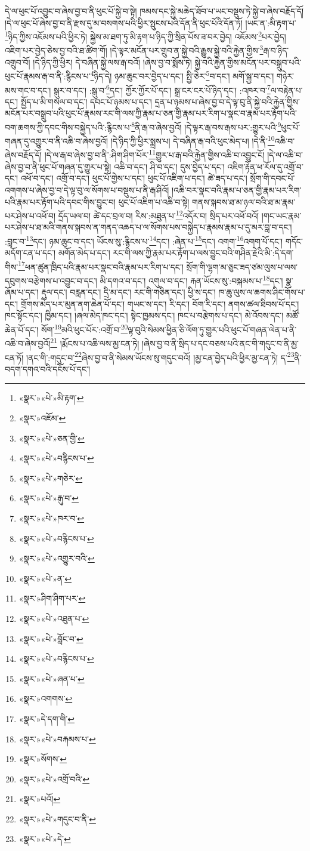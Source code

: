 དེ་ལ་ཕུང་པོ་འབྱུང་བ་ཞེས་བྱ་བ་ནི་ཕུང་པོ་སྐྱེ་བ་སྟེ། ཁམས་དང་སྐྱེ་མཆེད་ཐོབ་པ་ཡང་བསྡུས་ཏེ་སྐྱེ་བ་ཞེས་བརྗོད་དོ། །དེ་ལ་ཕུང་པོ་ཞེས་བྱ་བ་ནི་རྫས་དུ་མ་བསགས་པའི་ཕྱིར་སྤུངས་པའི་དོན་ནི་ཕུང་པོའི་དོན་ཏོ། །ཡང་ན་:མི་རྟག་པ་\footnote{«སྣར་»«པེ་»མི་རྟག་}ཉིད་ཀྱིས་འཇོམས་པའི་ཕྱིར་ཏེ། སྐྱེས་མ་ཐག་ཏུ་མི་རྟག་པ་ཉིད་ཀྱི་སྲིན་པོས་ཟ་བར་བྱེད། འཇོམས་\footnote{«སྣར་»འཇོམ་}པར་བྱེད། འཇིག་པར་བྱེད་ཅེས་བྱ་བའི་ཐ་ཚིག་གོ། །དེ་ལྟར་མངོན་པར་གྲུབ་ན་སྐྱེ་བའི་རྒྱུས་སྐྱེ་བའི་རྐྱེན་གྱིས་\footnote{«སྣར་»«པེ་»ཅན་གྱི་}རྒ་བ་ཉིད་འགྲུབ་བོ། །དེ་ཉིད་ཀྱི་ཕྱིར། དེ་བཞིན་སྐྱེ་ལས་རྒ་བའོ། །ཞེས་བྱ་བ་སྨོས་ཏེ། སྐྱེ་བའི་རྐྱེན་གྱིས་མངོན་པར་བསྒྲུབ་པའི་ཕུང་པོ་རྣམས་རྒ་བ་ནི་:རྙིངས་པ་\footnote{«སྣར་»«པེ་»བརྙིངས་པ་}ཉིད་དེ། ཉམ་ཆུང་བར་བྱེད་པ་དང་། སྤྱི་ཅེར་\footnote{«སྣར་»«པེ་»གཅེར་}བ་དང་། མགོ་སྐྱ་བ་དང་། གཉེར་མས་གང་བ་དང་། སྒུར་བ་དང་། :སྒུ་བ་\footnote{«སྣར་»«པེ་»རྒུ་བ་}དང་། ཀྱོར་ཀྱོར་པོ་དང་། སྒྲ་ངར་ངར་པོ་ཉིད་དང་། :འཁར་བ་\footnote{«སྣར་»«པེ་»ཁར་བ་}ལ་བརྟེན་པ་དང་། སྤྱོད་པ་མི་གསལ་བ་དང་། དབང་པོ་ཉམས་པ་དང་། དྲན་པ་ཉམས་པ་ཞེས་བྱ་བ་དེ་ལྟ་བུ་ནི་སྐྱེ་བའི་རྐྱེན་གྱིས་མངོན་པར་བསྒྲུབ་པའི་ཕུང་པོ་རྣམས་རང་གི་ལས་ཀྱི་རྣམ་པ་ཅན་གྱི་རྣམ་པར་རིག་པ་སྣང་བ་རྣམ་པར་རྟོག་པའི་བག་ཆགས་ཀྱི་དབང་གིས་བསྐྱེད་པའི་:རྙིངས་པ་\footnote{«སྣར་»«པེ་»བརྙིངས་པ་}ནི་རྒ་བ་ཞེས་བྱའོ། །དེ་ལྟར་རྒ་བས་རྒས་པར་:གྱུར་པའི་\footnote{«སྣར་»«པེ་»འགྱུར་བའི་}ཕུང་པོ་གཞན་དུ་འགྱུར་བ་ནི་འཆི་བ་ཞེས་བྱའོ། །དེ་ཉིད་ཀྱི་ཕྱིར་སྨྲས་པ། དེ་བཞིན་རྒ་བའི་ཕུང་མེད་པ། །དེ་ནི་\footnote{«སྣར་»«པེ་»ན་}འཆི་བ་ཞེས་བརྗོད་དོ། །དེ་ལ་རྒ་བ་ཞེས་བྱ་བ་ནི་:ཤིག་ཤིག་པོར་\footnote{«སྣར་»ཤིག་ཤིག་པར་}གྱུར་པ་རྒ་བའི་རྐྱེན་གྱིས་འཆི་བ་འབྱུང་ངོ། །དེ་ལ་འཆི་བ་ཞེས་བྱ་བ་ནི་ཕུང་པོ་གཞན་དུ་གྱུར་པ་སྟེ། འཆི་བ་དང་། ཤི་བ་དང་། དུས་བྱེད་པ་དང་། འཇིག་རྟེན་ཕ་རོལ་དུ་འགྲོ་བ་དང་། འཕོ་བ་དང་། འགྲོ་བ་དང་། ཕུང་པོ་གྱེས་པ་དང་། ཕུང་པོ་འཇིག་པ་དང་། ཚེ་ཟད་པ་དང་། སྲོག་གི་དབང་པོ་འགགས་པ་ཞེས་བྱ་བ་དེ་ལྟ་བུ་ལ་སོགས་པ་བསྡུས་པ་ནི་རྒ་ཤིའོ། །འཆི་བར་སྣང་བའི་རྣམ་པ་ཅན་གྱི་རྣམ་པར་རིག་པའི་རྣམ་པར་རྟོག་པའི་དབང་གིས་བྱུང་བ། ཕུང་པོ་འཇིག་པ་འཆི་བ་སྟེ། གནས་སྐབས་ཐ་མ་ཉལ་བའི་ཐ་མ་རྣམ་པར་ཤེས་པ་འཕོ་བ། དྲོད་ཡལ་བ། ཚེ་དང་བྲལ་བ། རིས་:མཐུན་པ་\footnote{«སྣར་»«པེ་»འཐུན་པ་}འདོར་བ། སྲིད་པར་འཕོ་བའོ། །གང་ཡང་རྣམ་པར་ཤེས་པ་ཐ་མའི་གནས་སྐབས་ན་གནད་འཆད་པ་ལ་སོགས་པས་བསྐྱེད་པ་རྣམས་རྣམ་པ་དུ་མར་བླ་བ་དང་། :བླང་བ་\footnote{«སྣར་»«པེ་»བློང་བ་}དང་། ཉམ་ཆུང་བ་དང་། ཡོངས་སུ་:རྙིངས་པ་\footnote{«སྣར་»«པེ་»བརྙིངས་པ་}དང་། :ཞེན་པ་\footnote{«སྣར་»«པེ་»ཞན་པ་}དང་། འགག་\footnote{«སྣར་»འགགས་}འགག་པོ་དང་། གདོང་མདོག་ངན་པ་དང་། མགོན་མེད་པ་དང་། རང་གི་ལས་ཀྱི་རྣམ་པར་རྟོག་པ་ལས་བྱུང་བའི་གཤིན་རྗེའི་མི་:དེ་དག་གིས་\footnote{«སྣར་»དེ་དག་གི་}ཕན་ཚུན་ཁྲིད་པའི་རྣམ་པར་སྣང་བའི་རྣམ་པར་རིག་པ་དང་། སྲོག་གི་ལྷག་མ་ཅུང་ཟད་ཙམ་ལུས་པ་ལས་དབུགས་བརྩེགས་པ་འབྱུང་བ་དང་། མི་དགའ་བ་དང་། འགུལ་བ་དང་། རྐན་ཡོངས་སུ་:བསྐམས་པ་\footnote{«སྣར་»«པེ་»བརྐམས་པ་}དང་། སྣ་ཞོམ་པ་དང་། རྡུལ་དང་། བརླན་དང་། དྲི་མ་དང་། རང་གི་གཅིན་དང་། ཕྱི་ས་དང་། ཁ་ཆུ་ལུས་ལ་ཆགས་ཤིང་གོས་པ་དང་། གྲོགས་མེད་པར་མུན་ནག་ཆེན་པོ་དང་། གཡང་ས་དང་། རི་དང་། བོག་རི་དང་། ནགས་ཚལ་ཐིབས་པོ་དང་། ཁང་སྟོང་དང་། ཁྱིམ་དང་། །ཞལ་མེད་ཁང་དང་། སྟེང་ཁྱམས་དང་། ཁང་པ་བརྩེགས་པ་དང་། མེ་འོབས་དང་། མཚོ་ཆེན་པོ་དང་། སོག་\footnote{«སྣར་»སོགས་}མའི་ཕུང་པོར་:འགྲོ་བ་\footnote{«སྣར་»«པེ་»འགྲོ་བའི་}ལྟ་བུའི་སེམས་ཕྱིན་ཅི་ལོག་ཏུ་གྱུར་པའི་ཕུང་པོ་གཞན་ལེན་པ་ནི་འཆི་བ་ཞེས་བྱའོ།\footnote{«སྣར་»པའོ།} །རྨོངས་པ་འཆི་ལས་མྱ་ངན་ཏེ། །ཞེས་བྱ་བ་ནི་སྲིད་པ་དང་བཅས་པའི་ནང་གི་གདུང་བ་ནི་མྱ་ངན་ཏོ། །ནང་གི་:གདུང་བ་\footnote{«སྣར་»«པེ་»གདུང་བ་ནི་}ཞེས་བྱ་བ་ནི་སེམས་ཡོངས་སུ་གདུང་བའོ། །མྱ་ངན་བྱེད་པའི་ཕྱིར་མྱ་ངན་ཏེ། ད་\footnote{«སྣར་»«པེ་»དེ་}ནི་བདག་དགའ་བའི་དངོས་པོ་དང་། 